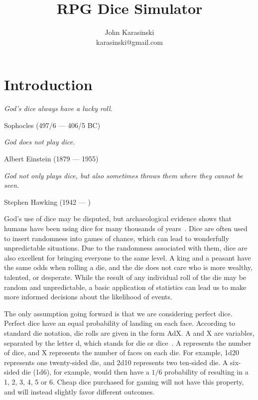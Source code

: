 \documentclass[twocolumn,letterpaper]{article}  %
\begin{document}
\title{RPG Dice Simulator}
\author{%
John Karasinski\\
karasinski@gmail.com
}
\date{}

\maketitle

\thispagestyle{plain}
\pagestyle{plain}

\section{Introduction}

\epigraph{\small\itshape God's dice always have a lucky roll.}{Sophocles (497/6 --- 406/5 BC)}%
\vspace{-2em}
\epigraph{\small\itshape God does not play dice.}{Albert Einstein (1879 --- 1955)}%
\vspace{-2em}
\epigraph{\small\itshape God not only plays dice, but also sometimes throws them where they cannot be seen.}{Stephen Hawking (1942 --- \hspace{1.5em})}%

God's use of dice may be disputed, but archaeological evidence shows that humans have been using dice for many thousands of years~\cite{history}. Dice are often used to insert randomness into games of chance, which can lead to wonderfully unpredictable situations. Due to the randomness associated with them, dice are also excellent for bringing everyone to the same level. A king and a peasant have the same odds when rolling a die, and the die does not care who is more wealthy, talented, or desperate. While the result of any individual roll of the die may be random and unpredictable, a basic application of statistics can lead us to make more informed decisions about the likelihood of events.

The only assumption going forward is that we are considering perfect dice. Perfect dice have an equal probability of landing on each face. According to standard die notation, die rolls are given in the form AdX. A and X are variables, separated by the letter d, which stands for die or dice~\cite{dice_notation}. A represents the number of dice, and X represents the number of faces on each die. For example, 1d20 represents one twenty-sided die, and 2d10 represents two ten-sided die. A six-sided die (1d6), for example, would then have a $1/6$ probability of resulting in a 1, 2, 3, 4, 5 or 6. Cheap dice purchased for gaming will not have this property, and will instead slightly favor different outcomes.
\end{document}

